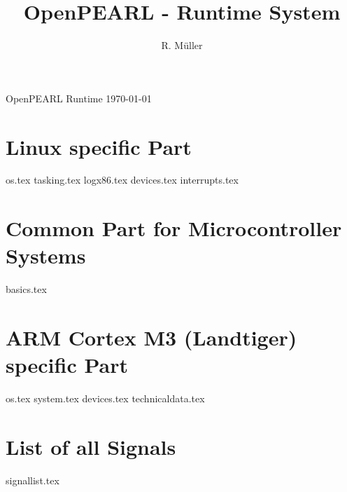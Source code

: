 \documentclass[12pt]{scrbook}
\begin{document}
\title{OpenPEARL - Runtime System}
\author{R. M\"uller}

 {
}%
{}%

 {
}%
{}%

\newenvironment{classSummary}%
{\vspace{3mm}\colorbox{black!15}{\parbox{5cm}{Class Summary}}\\
\begin{tabular}{|p{5cm}|p{9cm}|}
\hline
Item & Value \\
\hline}
{\hline\end{tabular}\vspace{3mm}}

\newenvironment{methodMapping}%
{\vspace{3mm}\colorbox{black!15}{\parbox{5cm}{Method Mapping}}\\
\begin{tabular}{|p{3cm}|p{4cm}|p{6.5cm}|}
\hline
Operation & Method & Remarks\\
\hline}
{\hline\end{tabular}\vspace{3mm}}

\pagestyle{myheadings}
 {OpenPEARL Runtime \today}

\maketitle

\tableofcontents













\chapter{Linux specific Part}
{os.tex}
{tasking.tex}
{logx86.tex}
{devices.tex}
{interrupts.tex}

\chapter{Common Part for Microcontroller Systems}
{basics.tex}

\chapter{ARM Cortex M3 (Landtiger) specific Part}
{os.tex}
{system.tex}
{devices.tex}
{technicaldata.tex}

\chapter{List of all Signals}
{signallist.tex}


\end{document}

